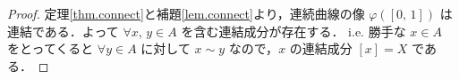 \documentclass[geometry_main]{subfiles}
\begin{document}
\hrulefill

\begin{proof}
	定理\ref{thm.connect}と補題\ref{lem.connect}より，連続曲線の像 $\varphi([0,\, 1])$ は連結である．よって $\forall x,\, y \in A$ を含む連結成分が存在する．
	i.e. 勝手な $x \in A$ をとってくると $\forall y \in A$ に対して $x \sim y$ なので，$x$ の連結成分 $[x] = X$ である．
\end{proof}
\end{document}
